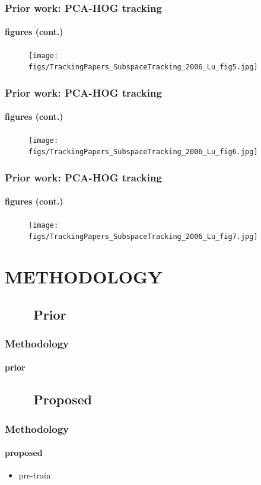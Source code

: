 \begin{frame}
\frametitle{Prior work: PCA-HOG tracking}
\framesubtitle{figures (cont.)}
\mypagenum
	\begin{figure}
		\texttt{[image: figs/TrackingPapers\_SubspaceTracking\_2006\_Lu\_fig5.jpg]}
	\end{figure}
\end{frame}




\begin{frame}
\frametitle{Prior work: PCA-HOG tracking}
\framesubtitle{figures (cont.)}
\mypagenum
	\begin{figure}
		\texttt{[image: figs/TrackingPapers\_SubspaceTracking\_2006\_Lu\_fig6.jpg]}
	\end{figure}
\end{frame}




\begin{frame}
\frametitle{Prior work: PCA-HOG tracking}
\framesubtitle{figures (cont.)}
\mypagenum
	\begin{figure}
		\texttt{[image: figs/TrackingPapers\_SubspaceTracking\_2006\_Lu\_fig7.jpg]}
	\end{figure}
\end{frame}


\section{METHODOLOGY}
\subsection{\ \ \ \ Prior}
\begin{frame}
\frametitle{Methodology}
\framesubtitle{prior}
\logoCSIPCPL\mypagenum
\end{frame}

\subsection{\ \ \ \ Proposed}
\begin{frame}
\frametitle{Methodology}
\framesubtitle{proposed}
	\begin{itemize}
		\item pre-train

	\end{itemize}
\logoCSIPCPL\mypagenum
\end{frame}

